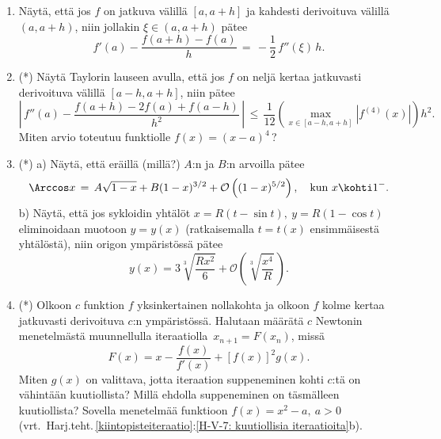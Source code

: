 \begin{enumerate}
\item \label{H-dif-5: virhearvio (a)}
Näytä, että jos $f$ on jatkuva välillä $[a,a+h]$ ja
kahdesti derivoituva välillä $(a,a+h)$, niin jollakin $\xi\in(a,a+h)$ pätee
\[
f'(a)-\frac{f(a+h)-f(a)}{h} \,=\, -\frac{1}{2}\,f''(\xi)\,h.
\]

\item (*) \label{H-dif-5: virhearvio (c)}
Näytä Taylorin lauseen avulla, että jos $f$ on neljä
kertaa jatkuvasti derivoituva välillä $[a-h,a+h]$, niin pätee
\[
\left|\,f''(a)-\frac{f(a+h)-2f(a)+f(a-h)}{h^2}\,\right| 
               \,\le\,\frac{1}{12}\left(\max_{x\in[a-h,a+h]}|f^{(4)}(x)|\right) h^2.
\]
Miten arvio toteutuu funktiolle $f(x)=(x-a)^4$\,?

\item (*)
a) Näytä, että eräillä (millä?) $A$:n ja $B$:n arvoilla pätee
\[
\Arccos x\,=\,A\sqrt{1-x}+B(1-x)^{3/2}+\mathcal{O}\left((1-x)^{5/2}\right),
\quad \text{kun}\ x \kohti 1^-.
\]
b) Näytä, että jos sykloidin yhtälöt $x=R(t-\sin t),\ y=R(1-\cos t)$ eliminoidaan muotoon
$y=y(x)$ (ratkaisemalla $t=t(x)$ ensimmäisestä yhtälöstä), niin origon ympäristössä pätee
\[
y(x) = 3\sqrt[3]{\frac{Rx^2}{6}}+\mathcal{O}\left(\sqrt[3]{\frac{x^4}{R}}\,\right).
\]

\item (*)
Olkoon $c$ funktion $f$ yksinkertainen nollakohta ja olkoon $f$ kolme kertaa jatkuvasti
derivoituva $c$:n ympäristössä. Halutaan määrätä $c$ Newtonin menetelmästä muunnellulla
iteraatiolla $\,x_{n+1}=F(x_n)$, missä
\[
F(x)=x-\frac{f(x)}{f'(x)}+[f(x)]^2g(x).
\]
Miten $g(x)$ on valittava, jotta iteraation suppeneminen kohti $c$:tä on vähintään
kuutiollista? Millä ehdolla suppeneminen on täsmälleen kuutiollista? Sovella menetelmää 
funktioon $f(x)=x^2-a,\ a>0$
(vrt.\ Harj.teht.\,\ref{kiintopisteiteraatio}:\ref{H-V-7: kuutiollisia iteraatioita}b).

\end{enumerate}
